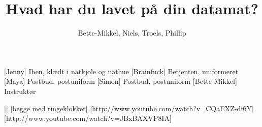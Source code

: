 \documentclass[a4paper,11pt]{article}
\title{Hvad har du lavet på din datamat?}
\author{Bette-Mikkel, Niels, Troels, Phillip}
\begin{document}
\maketitle

\begin{roles}
[Jenny] Iben, klædt i natkjole og nathue
[Brainfuck] Betjenten, uniformeret
[Maya] Postbud, postuniform
[Simon] Postbud, postuniform
[Bette-Mikkel] Instruktør
\end{roles}

\begin{props}
[]
[begge med ringeklokker]
[http://www.youtube.com/watch?v=CQaEXZ-df6Y] %
[http://www.youtube.com/watch?v=JBxBAXVP8IA] %
\end{props}
\end{document}

